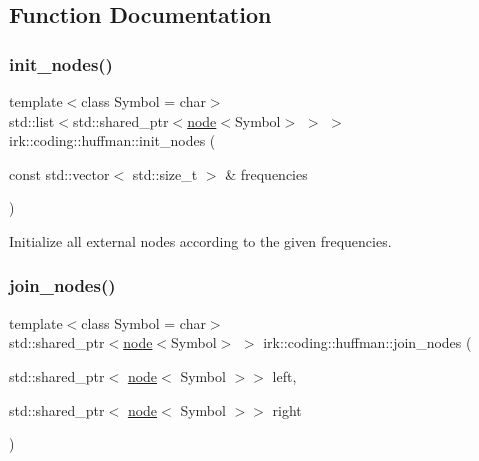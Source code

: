 \subsection{Function Documentation}
\mbox{\label{namespaceirk_1_1coding_1_1huffman_abbb62b84b6667cc6ed6000f36a52414c}} 
\subsubsection{\texorpdfstring{init\+\_\+nodes()}{init\_nodes()}}
{\footnotesize\ttfamily template$<$class Symbol  = char$>$ \\
std\+::list$<$std\+::shared\+\_\+ptr$<$\mbox{\hyperlink{structirk_1_1coding_1_1huffman_1_1node}{node}}$<$Symbol$>$ $>$ $>$ irk\+::coding\+::huffman\+::init\+\_\+nodes (\begin{DoxyParamCaption}\item[{const std\+::vector$<$ std\+::size\+\_\+t $>$ \&}]{frequencies }\end{DoxyParamCaption})}



Initialize all external nodes according to the given frequencies. 

\mbox{\label{namespaceirk_1_1coding_1_1huffman_ac5ed25bf8ec1c076d2905f59e3930502}} 
\subsubsection{\texorpdfstring{join\+\_\+nodes()}{join\_nodes()}}
{\footnotesize\ttfamily template$<$class Symbol  = char$>$ \\
std\+::shared\+\_\+ptr$<$\mbox{\hyperlink{structirk_1_1coding_1_1huffman_1_1node}{node}}$<$Symbol$>$ $>$ irk\+::coding\+::huffman\+::join\+\_\+nodes (\begin{DoxyParamCaption}\item[{std\+::shared\+\_\+ptr$<$ \mbox{\hyperlink{structirk_1_1coding_1_1huffman_1_1node}{node}}$<$ Symbol $>$$>$}]{left,  }\item[{std\+::shared\+\_\+ptr$<$ \mbox{\hyperlink{structirk_1_1coding_1_1huffman_1_1node}{node}}$<$ Symbol $>$$>$}]{right }\end{DoxyParamCaption})}



